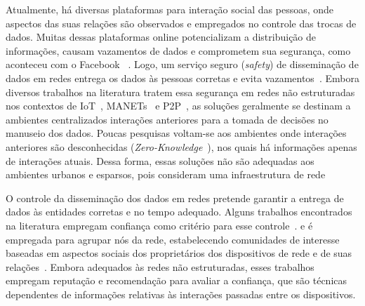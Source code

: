 Atualmente, há  diversas plataformas para interação social das pessoas, onde aspectos das suas relações são observados e empregados no controle das trocas de dados. Muitas dessas plataformas online potencializam a distribuição de informações, causam vazamentos de dados e comprometem sua segurança, como aconteceu com o Facebook ~\cite{FacebookLeakage}. Logo, um serviço seguro (\textit{safety}) de disseminação de dados em redes entrega os dados às pessoas corretas e evita vazamentos~\cite{lima2009survey}. Embora diversos trabalhos na literatura tratem essa segurança em redes não estruturadas nos contextos de IoT~\cite{al2017trust,bao2013scalable}, MANETs~\cite{mannes2012quorum} e P2P~\cite{vasilomanolakis2017trust},  as soluções geralmente se destinam a ambientes centralizados  interações anteriores para a tomada de decisões no manuseio dos dados. Poucas pesquisas voltam-se aos ambientes onde interações anteriores são desconhecidas (\textit{Zero-Knowledge}~\cite{feige1988zero}), nos quais há informações apenas de interações atuais. Dessa forma, essas soluções não são adequadas aos ambientes urbanos   e esparsos, pois consideram  uma infraestrutura de rede %

O controle da disseminação dos dados em redes pretende garantir a entrega de dados às entidades corretas e no tempo adequado. Alguns trabalhos encontrados na literatura empregam confiança como critério para esse controle~\cite{al2017trust}.  e é empregada para agrupar nós da rede, estabelecendo comunidades de interesse baseadas em aspectos sociais dos proprietários dos dispositivos de rede e de suas relações~\cite{bao2013scalable}. Embora adequados às redes não estruturadas, esses trabalhos empregam reputação e recomendação para avaliar a confiança, que são técnicas dependentes de informações relativas às interações passadas entre os dispositivos. 

